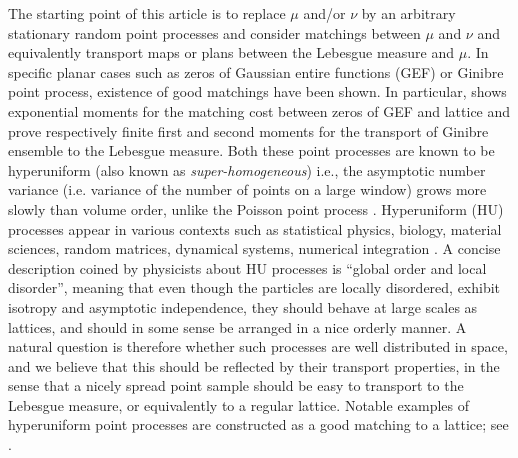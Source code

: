 \documentclass[12pt]{article}
\newcommand{\1}{\mathbf{1}}
\begin{document}
The starting point of this article is to replace $\mu$ and/or $\nu$ by an {arbitrary} stationary random point processes and consider matchings between $\mu$ and $\nu$ and equivalently transport {maps or plans between} the Lebesgue measure  {and} $\mu$. In specific planar cases such as zeros of Gaussian entire functions (GEF) or Ginibre point process, existence of good matchings have been shown.
 In particular, \cite{sodin2006random} shows exponential moments for the matching cost between zeros of GEF and lattice and \cite{jalowy2021wasserstein,prod2021contributions} prove respectively finite first and second moments for the transport {of Ginibre ensemble} to the Lebesgue measure.
Both these point processes are known to be hyperuniform ({also known as {\it super-homogeneous}}) i.e., the asymptotic {number variance (i.e. variance of the number of points on a large window)} grows more slowly than volume order, unlike the {Poisson point process \cite{torquato2003local,gabrielli2002glass}}. {Hyperuniform (HU)} processes appear in various contexts such as statistical physics, biology,  material sciences, random matrices, dynamical systems, numerical integration  \cite{torquato2018hyperuniform,coste2021order}.  A concise description coined by physicists about HU processes is ``global order and local disorder'', meaning that even though the particles are locally disordered, exhibit isotropy and asymptotic independence, they should behave at large scales as lattices, and should in some sense be arranged in a nice orderly manner. {A natural question is therefore whether such processes are well distributed in space, and we believe that this should be reflected by their transport properties, in the sense that a nicely spread point sample should be easy to transport to the Lebesgue measure, or equivalently to a regular lattice.} {Notable examples of hyperuniform point processes are  constructed as a good matching to a lattice; see \cite{peres2014rigidity,andreas2020hyperuniform,Lotz2023}.}
\end{document}
